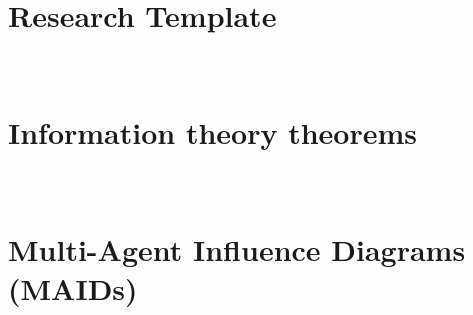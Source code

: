 \documentclass[12pt, oneside]{lib/ucthesis}
\begin{document}
\begin{dissertationText}
\appendix
\chapter[Research Template]{Research Template}~\label{appendix:template}


\chapter[DPI Theorems]{Information theory theorems}~\label{appendix:information-theory-theorems}


\chapter[Multi-Agent Influence Diagrams]{Multi-Agent Influence Diagrams (MAIDs)}~\label{appendix:maid}
	

\end{dissertationText}
\end{document}
